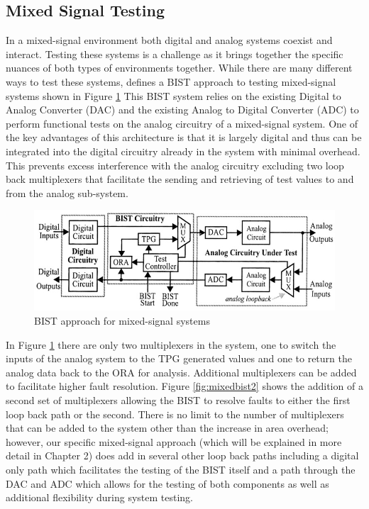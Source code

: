 \documentclass[12pt]{report}
\begin{document}
\subsection{Mixed Signal Testing}
\label{sct:MixedSignal}
In a mixed-signal environment both digital and analog systems coexist and interact.  Testing these systems is a challenge as it brings together the specific nuances of both types of environments together.  While there are many different ways to test these systems, \cite{stroud} defines a BIST approach to testing mixed-signal systems shown in Figure \ref{fig:mixedbist1}  This BIST system relies on the existing Digital to Analog Converter (DAC) and the existing Analog to Digital Converter (ADC) to perform functional tests on the analog circuitry of a mixed-signal system.  One of the key advantages of this architecture is that it is largely digital and thus can be integrated into the digital circuitry already in the system with minimal overhead.  This prevents excess interference with the analog circuitry excluding two loop back multiplexers that facilitate the sending and retrieving of test values to and from the analog sub-system\cite{stroud}.
\begin{figure}
	\begin{center}
		\includegraphics[scale=1]{images/mixed-bist-architecture}
	\end{center}
	\caption{BIST approach for mixed-signal systems\cite{stroud}}
	\label{fig:mixedbist1}
\end{figure}
In Figure \ref{fig:mixedbist1} there are only two multiplexers in the system, one to switch the inputs of the analog system to the TPG generated values and one to return the analog data back to the ORA for analysis.  Additional multiplexers can be added to facilitate higher fault resolution.  Figure \ref{fig:mixedbist2} shows the addition of a second set of multiplexers allowing the BIST to resolve faults to either the first loop back path or the second\cite{stroud}.  There is no limit to the number of multiplexers that can be added to the system other than the increase in area overhead; however, our specific mixed-signal approach (which will be explained in more detail in Chapter 2) does add in several other loop back paths including a digital only path which facilitates the testing of the BIST itself and a path through the DAC and ADC which allows for the testing of both components as well as additional flexibility during system testing.
\end{document}
